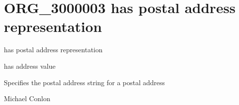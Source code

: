 \documentclass[letterpaper,10pt,english]{sphinxmanual}
\begin{document}
\section{ORG\_3000003 \sphinxhyphen{} has postal address representation}
\label{\detokenize{doc-ORG_3000003:org-3000003-has-postal-address-representation}}\label{\detokenize{doc-ORG_3000003:index-0}}\label{\detokenize{doc-ORG_3000003::doc}}
\begin{sphinxShadowBox}

\sphinxAtStartPar
has postal address representation
\end{sphinxShadowBox}

\begin{sphinxShadowBox}

\sphinxAtStartPar
has address value
\end{sphinxShadowBox}

\begin{sphinxShadowBox}

\sphinxAtStartPar
{\hyperref[\detokenize{doc-OBI_0002815::doc}]{}}
\end{sphinxShadowBox}

\begin{sphinxShadowBox}

\sphinxAtStartPar
Specifies the postal address string for a postal address
\end{sphinxShadowBox}

\begin{sphinxShadowBox}

\sphinxAtStartPar
Michael Conlon 
\end{sphinxShadowBox}

\begin{sphinxShadowBox}

\sphinxAtStartPar
{\hyperref[\detokenize{doc-IAO_0000422::doc}]{}}
\end{sphinxShadowBox}

\begin{sphinxShadowBox}

\sphinxAtStartPar
{}
\end{sphinxShadowBox}
\end{document}
